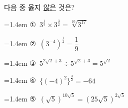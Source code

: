 다음 중 옳지 \underline{않은} 것은?
\par\medskip\par\noindent\hangindent=1.4em {\small ①}\ $3^{\frac{1}{5}}\times3^{\frac{3}{2}}=\sqrt[10]{3^{17}}$\par\noindent\hangindent=1.4em {\small ②}\ $(3^{-4})^{\frac{1}{2}}=\dfrac{1}{9}$\par\noindent\hangindent=1.4em {\small ③}\ $5^{2\sqrt{2}+3}\div5^{\sqrt{2}+3}=5^{\sqrt{2}}$\par\noindent\hangindent=1.4em {\small ④}\ $\{(-4)^2\}^{\frac{3}{2}}=-64$\par\noindent\hangindent=1.4em {\small ⑤}\ $(\sqrt{5})^{10\sqrt{5}}=(25\sqrt{5})^{2\sqrt{5}}$\par\medskip

